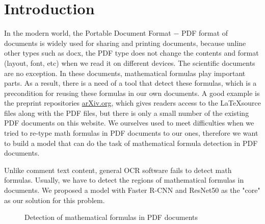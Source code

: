 \section{Introduction}
In the modern world, the Portable Document Format $-$ PDF format of documents is widely used for sharing and printing documents, because unline other types such as docx, the PDF type does not change the contents and format (layout, font, etc) when we read it on different devices. The scientific documents are no exception. In these documents, mathematical formulas play important parts. As a result, there is a need of a tool that detect these formulas, which is a precondition for reusing these formulas in our own documents. A good example is the preprint repositories \href{arXiv.org}{arXiv.org}, which gives readers access to the \LaTeX source files along with the PDF files, but there is only a small number of the existing PDF documents on this website. We ourselves used to meet difficulties when we tried to re-type math formulas in PDF documents to our ones, therefore we want to build a model that can do the task of mathematical formula detection in PDF documents.

Unlike comment text content, general OCR software fails to detect math formulas. Usually, we have to detect the regions of mathematical formulas in documents. We proposed a model with Faster R-CNN and ResNet50 as the "core" as our solution for this problem.
\begin{figure}[H]
\caption{Detection of mathematical formulas in PDF documents}
\end{figure}
